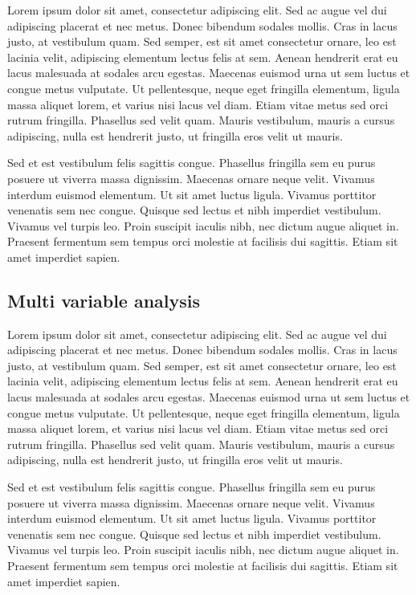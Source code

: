 Lorem ipsum dolor sit amet, consectetur adipiscing elit. Sed ac augue vel dui 
adipiscing placerat et nec metus. Donec bibendum sodales mollis. Cras in lacus 
justo, at vestibulum quam. Sed semper, est sit amet consectetur ornare, leo est 
lacinia velit, adipiscing elementum lectus felis at sem. Aenean hendrerit erat eu 
lacus malesuada at sodales arcu egestas. Maecenas euismod urna ut sem luctus et 
congue metus vulputate. Ut pellentesque, neque eget fringilla elementum, ligula 
massa aliquet lorem, et varius nisi lacus vel diam. Etiam vitae metus sed orci 
rutrum fringilla. Phasellus sed velit quam. Mauris vestibulum, mauris a cursus 
adipiscing, nulla est hendrerit justo, ut fringilla eros velit ut mauris.

Sed et est vestibulum felis sagittis congue. Phasellus fringilla sem eu purus 
posuere ut viverra massa dignissim. Maecenas ornare neque velit. Vivamus interdum 
euismod elementum. Ut sit amet luctus ligula. Vivamus porttitor venenatis sem nec 
congue. Quisque sed lectus et nibh imperdiet vestibulum. Vivamus vel turpis leo. 
Proin suscipit iaculis nibh, nec dictum augue aliquet in. Praesent fermentum sem 
tempus orci molestie at facilisis dui sagittis. Etiam sit amet imperdiet sapien.

\subsection{Multi variable analysis}

Lorem ipsum dolor sit amet, consectetur adipiscing elit. Sed ac augue vel dui 
adipiscing placerat et nec metus. Donec bibendum sodales mollis. Cras in lacus 
justo, at vestibulum quam. Sed semper, est sit amet consectetur ornare, leo est 
lacinia velit, adipiscing elementum lectus felis at sem. Aenean hendrerit erat eu 
lacus malesuada at sodales arcu egestas. Maecenas euismod urna ut sem luctus et 
congue metus vulputate. Ut pellentesque, neque eget fringilla elementum, ligula 
massa aliquet lorem, et varius nisi lacus vel diam. Etiam vitae metus sed orci 
rutrum fringilla. Phasellus sed velit quam. Mauris vestibulum, mauris a cursus 
adipiscing, nulla est hendrerit justo, ut fringilla eros velit ut mauris.

Sed et est vestibulum felis sagittis congue. Phasellus fringilla sem eu purus 
posuere ut viverra massa dignissim. Maecenas ornare neque velit. Vivamus interdum 
euismod elementum. Ut sit amet luctus ligula. Vivamus porttitor venenatis sem nec 
congue. Quisque sed lectus et nibh imperdiet vestibulum. Vivamus vel turpis leo. 
Proin suscipit iaculis nibh, nec dictum augue aliquet in. Praesent fermentum sem 
tempus orci molestie at facilisis dui sagittis. Etiam sit amet imperdiet sapien.

